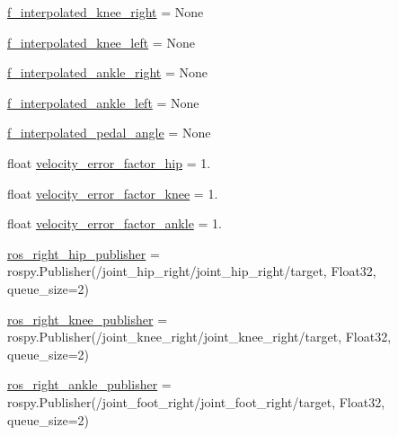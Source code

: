 \begin{DoxyCompactItemize}
\item 
\mbox{\hyperlink{namespacepedal__simulation__interpolation__lennard_a25823ada06679f005a4813fd7a0e5aa1}{f\+\_\+interpolated\+\_\+knee\+\_\+right}} = None
\item 
\mbox{\hyperlink{namespacepedal__simulation__interpolation__lennard_aa6fd62e75a805e24de11435ae622a825}{f\+\_\+interpolated\+\_\+knee\+\_\+left}} = None
\item 
\mbox{\hyperlink{namespacepedal__simulation__interpolation__lennard_aeca21c5de1513d9843aef387adca7162}{f\+\_\+interpolated\+\_\+ankle\+\_\+right}} = None
\item 
\mbox{\hyperlink{namespacepedal__simulation__interpolation__lennard_a2c7592ee2ffbefbf8f07b718f5652e13}{f\+\_\+interpolated\+\_\+ankle\+\_\+left}} = None
\item 
\mbox{\hyperlink{namespacepedal__simulation__interpolation__lennard_a0149951f09344add86b2532f27703a68}{f\+\_\+interpolated\+\_\+pedal\+\_\+angle}} = None
\item 
float \mbox{\hyperlink{namespacepedal__simulation__interpolation__lennard_ab2b562045985b126fd80c2eef4db855b}{velocity\+\_\+error\+\_\+factor\+\_\+hip}} = 1.
\item 
float \mbox{\hyperlink{namespacepedal__simulation__interpolation__lennard_ad80dc0226256a0f0623d781ae69844e0}{velocity\+\_\+error\+\_\+factor\+\_\+knee}} = 1.
\item 
float \mbox{\hyperlink{namespacepedal__simulation__interpolation__lennard_a77faa0597afb2fd0e9c902c74fb71101}{velocity\+\_\+error\+\_\+factor\+\_\+ankle}} = 1.
\item 
\mbox{\hyperlink{namespacepedal__simulation__interpolation__lennard_a1f86fb122869f37821b81a25640a51ec}{ros\+\_\+right\+\_\+hip\+\_\+publisher}} = rospy.\+Publisher(\textquotesingle{}/joint\+\_\+hip\+\_\+right/joint\+\_\+hip\+\_\+right/target\textquotesingle{}, Float32, queue\+\_\+size=2)
\item 
\mbox{\hyperlink{namespacepedal__simulation__interpolation__lennard_a5b234e7c1bcf1526acdf98ac26d4e208}{ros\+\_\+right\+\_\+knee\+\_\+publisher}} = rospy.\+Publisher(\textquotesingle{}/joint\+\_\+knee\+\_\+right/joint\+\_\+knee\+\_\+right/target\textquotesingle{}, Float32, queue\+\_\+size=2)
\item 
\mbox{\hyperlink{namespacepedal__simulation__interpolation__lennard_a4a0183a7877199982e236ccea14e6853}{ros\+\_\+right\+\_\+ankle\+\_\+publisher}} = rospy.\+Publisher(\textquotesingle{}/joint\+\_\+foot\+\_\+right/joint\+\_\+foot\+\_\+right/target\textquotesingle{}, Float32, queue\+\_\+size=2)

\end{DoxyCompactItemize}
